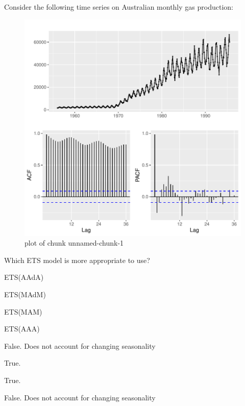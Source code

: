 
\begin{question}
Consider the following time series on Australian monthly gas production:

\begin{figure}[H]
\centering
\includegraphics{unnamed-chunk-1-1-2.pdf}
\caption{plot of chunk unnamed-chunk-1}
\end{figure}

Which ETS model is more appropriate to use?
\begin{answerlist}
  \item ETS(AAdA)
  \item ETS(MAdM)
  \item ETS(MAM)
  \item ETS(AAA)
\end{answerlist}
\end{question}

\begin{solution}
\begin{answerlist}
  \item False. Does not account for changing seasonality
  \item True.
  \item True.
  \item False. Does not account for changing seasonality
\end{answerlist}
\end{solution}

